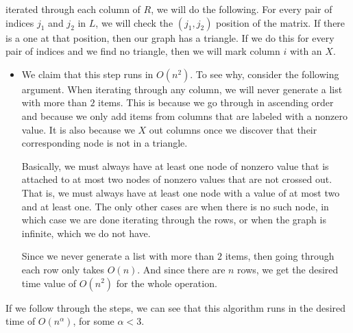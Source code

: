 \documentclass{article}
\begin{document}
\begin{description}
\begin{enumerate}
                iterated through each column of $R$, we will do the following.
                For every pair of indices
                $j_1$ and $j_2$ in $L$, we will check the $(j_1,j_2)$ position of
                the matrix. If there is a one at that position, then our graph
                has a triangle. If we do this for every pair of indices and we
                find no triangle, then we will mark column $i$ with an $X$.
                \begin{itemize}
                    \item We claim that this step runs in $O(n^2)$. To see why,
                        consider the following argument. When iterating through
                        any column, we will never generate a list with more than
                        $2$ items. This is because we go through in ascending
                        order and because we only add items from columns that
                        are labeled with a nonzero value. It is also because we
                        $X$ out columns once we discover that their
                        corresponding node is not in a triangle.

                        Basically, we must always have
                        at least one node of nonzero value that is
                        attached to at most two nodes of nonzero values that are
                        not crossed out. That is, we must always have at least
                        one node with a value of at most two and at least
                        one. The
                        only other cases are when there is no such node,
                        in which case we are done iterating through the rows, or when the graph is
                        infinite, which we do not have.

                        Since we never generate a list with more than $2$ items,
                        then going through each row only takes $O(n)$. And since
                        there are $n$ rows, we get the desired time value of
                        $O(n^2)$ for
                        the whole operation.
                \end{itemize}
        \end{enumerate}

        If we follow through the steps, we can see that this algorithm runs in
        the desired time of $O(n^{\alpha})$, for some $\alpha < 3$.


\end{description}
\end{document}
